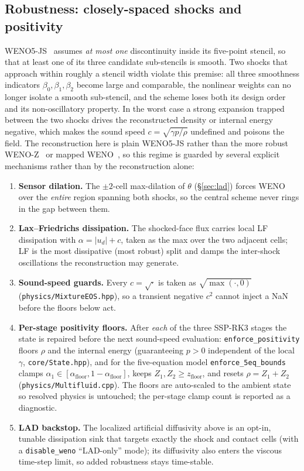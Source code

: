 \documentclass[11pt]{article}
\newcommand{\code}[1]{\texttt{#1}}
\begin{document}
\subsection{Robustness: closely-spaced shocks and positivity}
\label{sec:robustness}
WENO5-JS~\cite{jiang_shu_1996} assumes \emph{at most one} discontinuity inside its
five-point stencil, so that at least one of its three candidate sub-stencils is
smooth. Two shocks that approach within roughly a stencil width violate this
premise: all three smoothness indicators $\beta_0,\beta_1,\beta_2$ become large and
comparable, the nonlinear weights can no longer isolate a smooth sub-stencil, and
the scheme loses both its design order and its non-oscillatory property. In the
worst case a strong expansion trapped between the two shocks drives the
reconstructed density or internal energy negative, which makes the sound speed
$c=\sqrt{\gamma p/\rho}$ undefined and poisons the field. The reconstruction here
is plain WENO5-JS rather than the more robust WENO-Z~\cite{borges_2008} or mapped
WENO~\cite{henrick_2005}, so this regime is guarded by several explicit
mechanisms rather than by the reconstruction alone:
\begin{enumerate}
\item \textbf{Sensor dilation.} The $\pm2$-cell max-dilation of $\theta$
  (\S\ref{sec:lad}) forces WENO over the \emph{entire} region spanning both shocks,
  so the central scheme never rings in the gap between them.
\item \textbf{Lax--Friedrichs dissipation.} The shocked-face flux carries local LF
  dissipation with $\alpha=|u_d|+c$, taken as the max over the two adjacent cells;
  LF is the most dissipative (most robust) split and damps the inter-shock
  oscillations the reconstruction may generate.
\item \textbf{Sound-speed guards.} Every $c=\sqrt{\cdot}$ is taken as
  $\sqrt{\max(\cdot,0)}$ (\code{physics/MixtureEOS.hpp}), so a transient negative
  $c^2$ cannot inject a NaN before the floors below act.
\item \textbf{Per-stage positivity floors.} After \emph{each} of the three SSP-RK3
  stages the state is repaired before the next sound-speed evaluation:
  \code{enforce\_positivity} floors $\rho$ and the internal energy (guaranteeing
  $p>0$ independent of the local $\gamma$, \code{core/State.hpp}), and for the
  five-equation model \code{enforce\_5eq\_bounds} clamps
  $\alpha_1\in[\alpha_{\mathrm{floor}},1-\alpha_{\mathrm{floor}}]$, keeps
  $Z_1,Z_2\ge z_{\mathrm{floor}}$, and resets $\rho=Z_1+Z_2$
  (\code{physics/Multifluid.cpp}). The floors are auto-scaled to the ambient state
  so resolved physics is untouched; the per-stage clamp count is reported as a
  diagnostic.
\item \textbf{LAD backstop.} The localized artificial diffusivity above is an
  opt-in, tunable dissipation sink that targets exactly the shock and contact
  cells (with a \code{disable\_weno} ``LAD-only'' mode); its diffusivity also
  enters the viscous time-step limit, so added robustness stays time-stable.
\end{enumerate}
\end{document}
